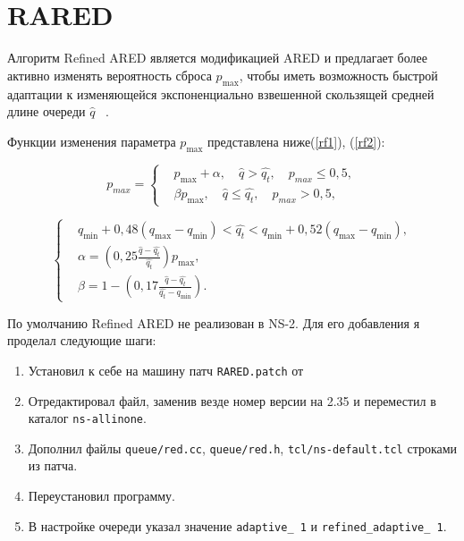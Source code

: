 \section{RARED}

Алгоритм Refined ARED является модификацией
ARED и предлагает более активно изменять вероятность сброса $p_{\max}$,
чтобы иметь возможность быстрой адаптации к изменяющейся
экспоненциально взвешенной скользящей средней длине очереди $\hat{q}$ ~\citep{RARED}.

Функции изменения параметра $p_{\max}$ представлена ниже(\ref{rf1}), (\ref{rf2}):

\begin{equation}
\label{rf1}
p_{max} = \left\{
  \begin{aligned}
& p_{\max}+\alpha, \quad  \hat{q}>\hat{q_{t}}, \quad p_{max} \leqslant 0,5, \\
& \beta p_{\max}, \quad \hat{q}\leqslant\hat{q_{t}}, \quad p_{max} > 0,5,
  \end{aligned}
\right.
\end{equation}

\begin{equation}
\label{rf2}
\left\{
  \begin{aligned}
    & q_{\min}+0,48\left(q_{\max}-q_{\min}\right) < \hat{q_t} < q_{\min}+0,52\left(q_{\max}-q_{\min}\right), \\
    & \alpha=\left(0,25\frac{\hat{q}-\hat{q_t}}{\hat{q_t}} \right)p_{\max}, \\ 
    & \beta=1-\left(0,17\frac{\hat{q}-\hat{q_t}}{\hat{q_t}-q_{\min}}\right).
  \end{aligned}
\right.
\end{equation}


По умолчанию Refined ARED не реализован в NS-2. Для его добавления я
проделал следующие шаги:

\begin{enumerate}
\item Установил к себе на машину патч \verb|RARED.patch| от 
\item Отредактировал файл, заменив везде номер версии на 2.35 и переместил в каталог \verb|ns-allinone|.
\item Дополнил файлы \verb|queue/red.cc|, \verb|queue/red.h|, \verb|tcl/ns-default.tcl| строками из патча.
\item Переустановил программу.
\item В настройке очереди указал значение \verb|adaptive_ 1| и 
\verb|refined_adaptive_ 1|.
\end{enumerate}
 
